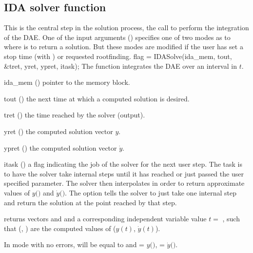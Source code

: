 {%

\subsection{IDA solver function}\label{sss:idasolve}
%
This is the central step in the solution process, the call to perform the
integration of the DAE.  One of the input arguments ()
specifies one of two modes as to where {\ida} is to return a solution.
But these modes are modified if the user has set a stop time (with
) or requested rootfinding.
%
{
  flag = IDASolve(ida\_mem, tout, \&tret, yret, ypret, itask);
}
{
  The function  integrates the DAE over an interval in $t$.
}
{
  \begin{args}
  \item[ida\_mem] ()
    pointer to the {\ida} memory block.
  \item[tout] ()
    the next time at which a computed solution is desired.
  \item[tret] ()
    the time reached by the solver (output).
  \item[yret] ()
    the computed solution vector $y$.
  \item[ypret] ()
    the computed solution vector $\dot{y}$.
  \item[itask] ()
    a flag indicating the job of the solver for the next user step.
    The  task is to have the solver take internal steps until
    it has reached or just passed the user specified 
    parameter. The solver then interpolates in order to
    return approximate values of $y($$)$ and $\dot{y}($$)$.
    The  option tells the solver to just take one internal step
    and return the solution at the point reached by that step.
  \end{args}
}
{
   returns vectors  and  and a
  corresponding independent variable value $t =$ , such that (,
  ) are the computed values of ($y(t)$, $\dot{y}(t)$).

  In  mode with no errors,  will be equal to 
  and  = $y($$)$,  = $\dot{y}($$)$.

}}
